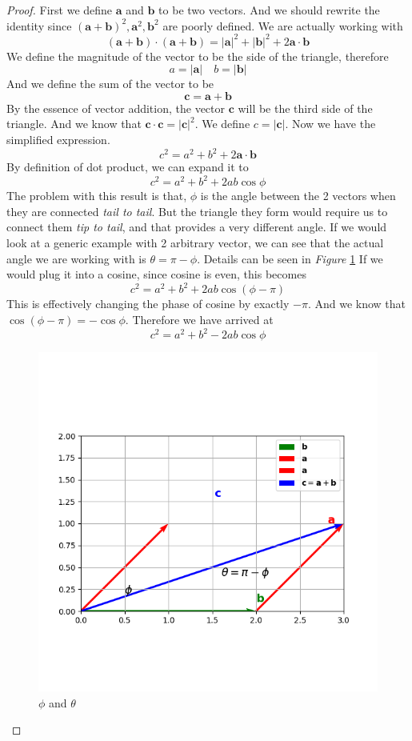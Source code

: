 \documentclass[12pt]{article}
\newcommand{\paren}[1]{\left( #1 \right)}
\newcommand{\abso}[1]{\left|#1 \right|}
\begin{document}
\begin{enumerate}
        \begin{proof}
            First we define $\mathbf{a}$ and $\mathbf{b}$ to be two vectors. And we should rewrite the identity since $(\mathbf{a} + \mathbf{b})^2, \mathbf{a}^2, \mathbf{b}^2$ are poorly defined. We are actually working with
            \[
            \paren{\mathbf{a}+\mathbf{b}}\cdot \paren{\mathbf{a}+\mathbf{b}} = \abso{\mathbf{a}}^2 + \abso{\mathbf{b}}^2 + 2\mathbf{a}\cdot \mathbf{b}
            \]
            We define the magnitude of the vector to be the side of the triangle, therefore 
            \[
            a = \abso{\mathbf{a}} \quad b = \abso{\mathbf{b}}
            \]
            And we define the sum of the vector to be
            \[
            \mathbf{c} = \mathbf{a}+\mathbf{b}
            \]
            By the essence of vector addition, the vector $\mathbf{c}$ will be the third side of the triangle. And we know that $\mathbf{c}\cdot \mathbf{c} = \abso{\mathbf{c}}^2$. We define $c = \abso{\mathbf{c}}$. Now we have the simplified expression.
            \[
            c^2 = a^2 + b^2 + 2\mathbf{a}\cdot\mathbf{b}
            \]
            By definition of dot product, we can expand it to 
            \[
            c^2 = a^2 + b^2 + 2ab\cos\phi
            \]
            The problem with this result is that, $\phi$ is the angle between the 2 vectors when they are connected \textit{tail to tail}. But the triangle they form would require us to connect them \textit{tip to tail}, and that provides a very different angle. If we would look at a generic example with 2 arbitrary vector, we can see that the actual angle we are working with is $\theta = \pi - \phi$. Details can be seen in \textit{Figure} \ref{fig:1.9} If we would plug it into a cosine, since cosine is even, this becomes
            \[
            c^2 = a^2 + b^2 + 2ab\cos\paren{\phi - \pi}
            \]
            This is effectively changing the phase of cosine by exactly $-\pi$. And we know that $\cos(\phi - \pi) = -\cos\phi$. Therefore we have arrived at
            \[
            c^2 = a^2 + b^2 - 2ab\cos\phi
            \]
            \begin{figure}
                \centering
                \includegraphics[width=0.4\linewidth]{Pictures/PS00/Figure_2.png}
                \caption{$\phi$ and $\theta$}
                \label{fig:1.9}
            \end{figure}
        \end{proof}


\end{enumerate}
\end{document}
